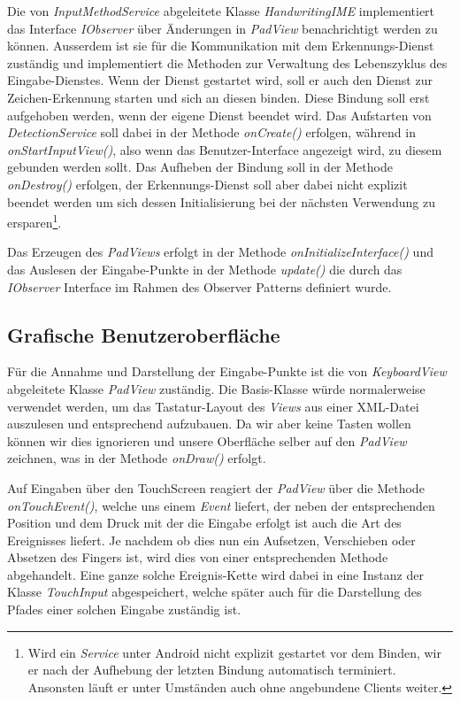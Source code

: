 Die von \emph{InputMethodService} abgeleitete Klasse \emph{HandwritingIME} implementiert das Interface \emph{IObserver} über Änderungen in \emph{PadView} benachrichtigt werden zu können. Ausserdem ist sie für die Kommunikation mit dem Erkennungs-Dienst zuständig und implementiert die Methoden zur Verwaltung des Lebenszyklus des Eingabe-Dienstes. Wenn der Dienst gestartet wird, soll er auch den Dienst zur Zeichen-Erkennung starten und sich an diesen binden. Diese Bindung soll erst aufgehoben werden, wenn der eigene Dienst beendet wird. Das Aufstarten von \emph{DetectionService} soll dabei in der Methode \emph{onCreate()}  erfolgen, während in \emph{onStartInputView()}, also wenn das Benutzer-Interface angezeigt wird, zu diesem gebunden werden sollt. Das Aufheben der Bindung soll in der Methode \emph{onDestroy()} erfolgen, der Erkennungs-Dienst soll aber dabei nicht explizit beendet werden um sich dessen Initialisierung bei der nächsten Verwendung zu ersparen\footnote{Wird ein \emph{Service} unter Android nicht explizit gestartet vor dem Binden, wir er nach der Aufhebung der letzten Bindung automatisch terminiert. Ansonsten läuft er unter Umständen auch ohne angebundene Clients weiter.}.

Das Erzeugen des \emph{PadViews} erfolgt in der Methode \emph{onInitializeInterface()} und das Auslesen der Eingabe-Punkte in der Methode \emph{update()} die durch das \emph{IObserver} Interface im Rahmen des Observer Patterns definiert wurde.

\subsection{Grafische Benutzeroberfläche}

Für die Annahme und Darstellung der Eingabe-Punkte ist die von \emph{KeyboardView} abgeleitete Klasse \emph{PadView} zuständig. Die Basis-Klasse würde normalerweise verwendet werden, um das Tastatur-Layout des \emph{Views} aus einer XML-Datei auszulesen und entsprechend aufzubauen. Da wir aber keine Tasten wollen können wir dies ignorieren und unsere Oberfläche selber auf den \emph{PadView} zeichnen, was in der Methode \emph{onDraw()} erfolgt.

Auf Eingaben über den TouchScreen reagiert der \emph{PadView} über die Methode \emph{onTouchEvent()}, welche uns einem \emph{Event} liefert, der neben der entsprechenden Position und dem Druck mit der die Eingabe erfolgt ist auch die Art des Ereignisses liefert. Je nachdem ob dies nun ein Aufsetzen, Verschieben oder Absetzen des Fingers ist, wird dies von einer entsprechenden Methode abgehandelt. Eine ganze solche Ereignis-Kette wird dabei in eine Instanz der Klasse \emph{TouchInput} abgespeichert, welche später auch für die Darstellung des Pfades einer solchen Eingabe zuständig ist.

